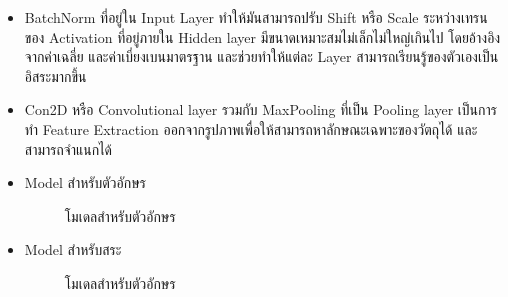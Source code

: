 \documentclass[12pt,oneside,openright,a4paper]{cpe-thai-project}
\begin{document}
\begin{itemize}
  \item BatchNorm ที่อยู่ใน Input Layer ทำให้มันสามารถปรับ Shift หรือ Scale ระหว่างเทรน ของ Activation  
  ที่อยู่ภายใน Hidden layer มีขนาดเหมาะสมไม่เล็กไม่ใหญ่เกินไป โดยอ้างอิงจากค่าเฉลี่ย และค่าเบี่ยงเบนมาตรฐาน และช่วยทำให้แต่ละ Layer สามารถเรียนรู้ของตัวเองเป็นอิสระมากขึ้น
  \item Con2D หรือ Convolutional layer รวมกับ MaxPooling ที่เป็น Pooling layer เป็นการทำ Feature Extraction ออกจากรูปภาพเพื่อให้สามารถหาลักษณะเฉพาะของวัตถุได้ และสามารถจำแนกได้
  \newpage
  \item Model สำหรับตัวอักษร 
  \begin{figure}[!ht]\centering
    \setlength{\fboxrule}{0.2mm} %
    \setlength{\fboxsep}{1cm}
    \caption{โมเดลสำหรับตัวอักษร}\label{fig:modelarchitecture}
   \end{figure}
  \item Model สำหรับสระ
  \begin{figure}[!ht]\centering
    \setlength{\fboxrule}{0.2mm} %
    \setlength{\fboxsep}{1cm}
    \caption{โมเดลสำหรับตัวอักษร}\label{fig:modelarchitecturevowel}
   \end{figure}
  \end{itemize}
\newpage
\end{document}
